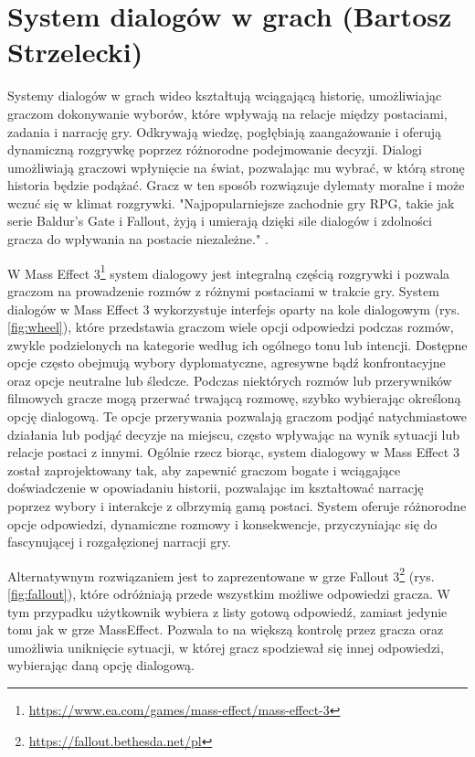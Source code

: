 \section{System dialogów w grach (Bartosz Strzelecki)}\label{chap:dialogi}
Systemy dialogów w grach wideo kształtują wciągającą historię, umożliwiając graczom dokonywanie wyborów, które wpływają na relacje między postaciami, zadania i narrację gry. 
Odkrywają wiedzę, pogłębiają zaangażowanie i oferują dynamiczną rozgrywkę poprzez różnorodne podejmowanie decyzji.
Dialogi umożliwiają graczowi wpłynięcie na świat, pozwalając mu wybrać, w którą stronę historia będzie podążać.
Gracz w ten sposób rozwiązuje dylematy moralne i może wczuć się w klimat rozgrywki.
"Najpopularniejsze zachodnie gry RPG, takie jak serie Baldur's Gate i Fallout, żyją i umierają dzięki sile dialogów i zdolności gracza do wpływania na postacie niezależne." \cite{dialogue}.

W Mass Effect 3\footnote{\url{https://www.ea.com/games/mass-effect/mass-effect-3}} system dialogowy jest integralną częścią rozgrywki i pozwala graczom na prowadzenie rozmów z różnymi postaciami w trakcie gry.
System dialogów w Mass Effect 3 wykorzystuje interfejs oparty na kole dialogowym (rys. \ref{fig:wheel}), które
przedstawia graczom wiele opcji odpowiedzi podczas rozmów, zwykle podzielonych na kategorie według ich ogólnego tonu lub intencji.
Dostępne opcje często obejmują wybory dyplomatyczne, agresywne bądź konfrontacyjne oraz opcje neutralne lub śledcze.
Podczas niektórych rozmów lub przerywników filmowych gracze mogą przerwać trwającą rozmowę, szybko wybierając określoną opcję dialogową.
Te opcje przerywania pozwalają graczom podjąć natychmiastowe działania lub podjąć decyzje na miejscu, często wpływając na wynik sytuacji lub relacje postaci z innymi.
Ogólnie rzecz biorąc, system dialogowy w Mass Effect 3 został zaprojektowany tak, aby zapewnić graczom bogate i wciągające doświadczenie w opowiadaniu historii,
pozwalając im kształtować narrację poprzez wybory i interakcje z olbrzymią gamą postaci. System oferuje różnorodne opcje odpowiedzi, dynamiczne rozmowy i konsekwencje,
przyczyniając się do fascynującej i rozgałęzionej narracji gry.

Alternatywnym rozwiązaniem jest to zaprezentowane w grze Fallout 3\footnote{\url{https://fallout.bethesda.net/pl}} (rys. \ref{fig:fallout}), które odróżniają przede wszystkim możliwe odpowiedzi gracza.
W tym przypadku użytkownik wybiera z listy gotową odpowiedź, zamiast jedynie tonu jak w grze MassEffect. Pozwala to na większą kontrolę
przez gracza oraz umożliwia uniknięcie sytuacji, w której gracz spodziewał się innej odpowiedzi, wybierając daną opcję dialogową.

